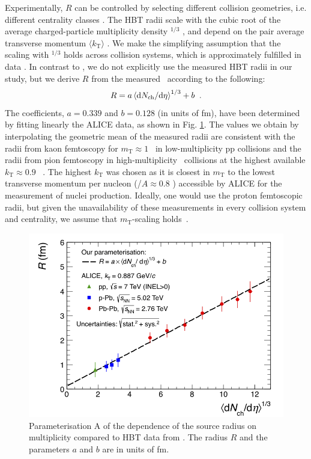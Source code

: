 Experimentally, $R$ can be controlled by selecting different collision geometries, i.e. different centrality classes \cite{Abelev:2013qoq}. 
The HBT radii scale with the cubic root of the average charged-particle multiplicity density \avdNdeta$^{1/3}$ \cite{Adam:2015vna}, and depend on the pair average transverse momentum $\langle k_{\mathrm{T}}\rangle$ \cite{Aamodt:2011mr}. We make the simplifying assumption that the scaling with \avdNdeta$^{1/3}$ holds across collision systems, which is approximately fulfilled in data \cite{Adam:2015pya}. 
In contrast to \cite{Blum:2017qnn}, we do not explicitly use the measured HBT radii in our study, but we derive $R$ from the measured \avdNdeta~according to the following:
%
\begin{equation}
R = a \left<\mathrm{d}N_\mathrm{ch}/\mathrm{d}\eta\right>^{1/3} + b \;\;.
\label{eq:radiusParameterisation}
\end{equation}
%
The coefficients, $a = 0.339$ and $b = 0.128$ (in units of fm), have been determined by fitting linearly the ALICE data, as shown in Fig. \ref{fig:radiiparam}. 
The values we obtain by interpolating the geometric mean of the measured radii are consistent with the radii from kaon femtoscopy for $m_{\mathrm{T}} \approx 1$ \GeVc~in low-multiplicity pp collisions \cite{Abelev:2012sq} and the radii from pion femtoscopy in high-multiplicity \PbPb~collisions at the highest available $k_{\mathrm{T}} \approx 0.9$ \GeVc~\cite{Adam:2015vna}. 
The highest $k_{\mathrm{T}}$ was chosen as it is closest in $m_{\mathrm{T}}$ to the lowest transverse momentum per nucleon (\pt/$A \approx 0.8$ \GeVc) accessible by ALICE for the measurement of nuclei production. 
Ideally, one would use the proton femtoscopic radii, but given the unavailability of these measurements in every collision system and centrality, we assume that $m_{\mathrm{T}}$-scaling holds~\cite{Adam:2015vja}. 

\begin{figure}[htbp]
\begin{center}
\includegraphics[width=\columnwidth]{../HbtRadiusParam.png}
\caption{Parameterisation A of the dependence of the source radius on multiplicity compared to HBT data from \cite{Adam:2015vna, Adam:2015pya, Abelev:2012sq}. The radius $R$ and the parameters $a$ and $b$ are in units of fm.}
\label{fig:radiiparam}
\end{center}
\end{figure}

